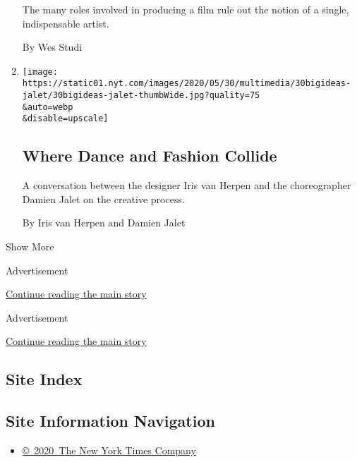 \begin{enumerate}
  The many roles involved in producing a film rule out the notion of a
  single, indispensable artist.

  By Wes Studi
\item
  \href{/2020/05/30/opinion/dance-fashion-herpen-jalet.html}{}

  \texttt{[image: https://static01.nyt.com/images/2020/05/30/multimedia/30bigideas-jalet/30bigideas-jalet-thumbWide.jpg?quality=75\\\&auto=webp\\\&disable=upscale]}

  \hypertarget{where-dance-and-fashion-collide}{%
  \subsection{Where Dance and Fashion
  Collide}\label{where-dance-and-fashion-collide}}

  A conversation between the designer Iris van Herpen and the
  choreographer Damien Jalet on the creative process.

  By Iris van Herpen and Damien Jalet
\end{enumerate}

Show More

Advertisement

\protect\hyperlink{after-mid1}{Continue reading the main story}

Advertisement

\protect\hyperlink{after-mktg}{Continue reading the main story}

\hypertarget{site-index}{%
\subsection{Site Index}\label{site-index}}

\hypertarget{site-information-navigation}{%
\subsection{Site Information
Navigation}\label{site-information-navigation}}

\begin{itemize}
\tightlist
\item
  \href{https://help.nytimes.com/hc/en-us/articles/115014792127-Copyright-notice}{©~2020~The
  New York Times Company}
\end{itemize}

